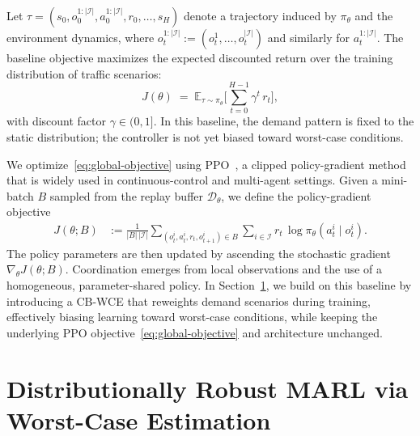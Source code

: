 \documentclass{ifacconf}
\newcommand{\1}{\mbox{1}\hspace{-0.25em}\mbox{l}}
\begin{document}
Let $\tau = (s_0,o_0^{1:|\mathcal{I}|},a_0^{1:|\mathcal{I}|},r_0,\dots,s_{H})$ denote a trajectory induced by $\pi_\theta$ and the environment dynamics, where $o_t^{1:|\mathcal{I}|} := (o_t^1,\dots,o_t^{|\mathcal{I}|})$ and similarly for $a_t^{1:|\mathcal{I}|}$. The baseline objective maximizes the expected discounted return over the training distribution of traffic scenarios:
\begin{equation}
J(\theta)
\;=\;
\mathbb{E}_{\tau \sim \pi_\theta}
\Bigg[
\sum_{t=0}^{H-1} \gamma^{t} \, r_t
\Bigg],
\label{eq:global-objective}
\end{equation}
with discount factor $\gamma\in(0,1]$. In this baseline, the demand pattern is fixed to the static distribution; the controller is not yet biased toward worst-case conditions.

We optimize~\eqref{eq:global-objective} using PPO~\citep{schulman2017proximal}, a clipped policy-gradient method that is widely used in continuous-control and multi-agent settings. 
Given a mini-batch 
$B$ sampled from the replay buffer $\mathcal{D}_\theta$, 
we define the policy-gradient objective
\begin{equation}
\begin{aligned}
    J(\theta; B)
    &:= 
    \frac{1}{|B|\,|\mathcal{I}|}
    \sum_{(o_t^i, a_t^i, r_t, o_{t+1}^i)\in B}
    \sum_{i\in\mathcal{I}}
        r_t \,\log \pi_\theta(a_t^i \mid o_t^i).
\end{aligned}
\end{equation}
The policy parameters are then updated by ascending the stochastic gradient 
$\nabla_\theta J(\theta; B)$.
Coordination emerges from local observations and the use of a homogeneous, parameter-shared policy. In Section~\ref{sec:method}, we build on this baseline by introducing a CB-WCE that reweights demand scenarios during training, effectively biasing learning toward worst-case conditions, while keeping the underlying PPO objective~\eqref{eq:global-objective} and architecture unchanged.













\section{Distributionally Robust MARL via Worst-Case Estimation}
\label{sec:method}
\end{document}
